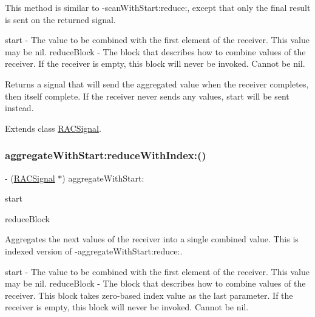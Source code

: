 This method is similar to -\/scan\+With\+Start\+:reduce\+:, except that only the final result is sent on the returned signal.

start -\/ The value to be combined with the first element of the receiver. This value may be {\ttfamily nil}. reduce\+Block -\/ The block that describes how to combine values of the receiver. If the receiver is empty, this block will never be invoked. Cannot be nil.

Returns a signal that will send the aggregated value when the receiver completes, then itself complete. If the receiver never sends any values, {\ttfamily start} will be sent instead. 

Extends class \mbox{\hyperlink{interface_r_a_c_signal_a4b872b6c2322aa37f98282043e768582}{R\+A\+C\+Signal}}.

\mbox{\label{category_r_a_c_signal_07_operations_08_a83c6fc367091505aa6721f1c6a58d65d}} 
\subsubsection{\texorpdfstring{aggregate\+With\+Start\+:reduce\+With\+Index\+:()}{aggregateWithStart:reduceWithIndex:()}\hspace{0.1cm}{\footnotesize\ttfamily [1/3]}}
{\footnotesize\ttfamily -\/ (\mbox{\hyperlink{interface_r_a_c_signal}{R\+A\+C\+Signal}} $\ast$) aggregate\+With\+Start\+: \begin{DoxyParamCaption}\item[{(id)}]{start }\item[{reduceWithIndex:(id($^\wedge$)(id running, id next, N\+S\+U\+Integer index))}]{reduce\+Block }\end{DoxyParamCaption}}

Aggregates the {\ttfamily next} values of the receiver into a single combined value. This is indexed version of -\/aggregate\+With\+Start\+:reduce\+:.

start -\/ The value to be combined with the first element of the receiver. This value may be {\ttfamily nil}. reduce\+Block -\/ The block that describes how to combine values of the receiver. This block takes zero-\/based index value as the last parameter. If the receiver is empty, this block will never be invoked. Cannot be nil.

